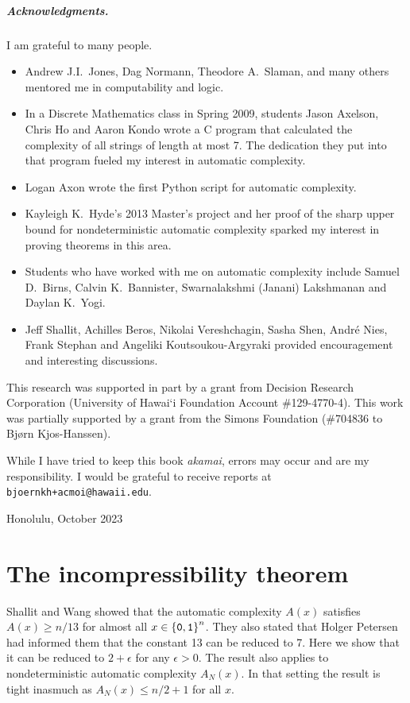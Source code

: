 	\paragraph*{Acknowledgments.}
	I am grateful to many people.
	\begin{itemize}
		\item Andrew J.I.~Jones, Dag Normann, Theodore A.~Slaman, and many others mentored me in computability and logic.
		\item In a Discrete Mathematics class in Spring 2009, students
			Jason Axelson, Chris Ho and Aaron Kondo wrote a C program that calculated the complexity of all strings of length at most 7.
			The dedication they put into that program fueled my interest in automatic complexity.
		\item Logan Axon wrote the first Python script for automatic complexity.
		\item Kayleigh K.~Hyde's 2013 Master's project and
			her proof of the sharp upper bound for nondeterministic automatic complexity sparked my interest in proving theorems in this area.
		\item Students who have worked with me on automatic complexity include Samuel D.~Birns, Calvin K.~Bannister, Swarnalakshmi (Janani) Lakshmanan and Daylan K.~Yogi.
		\item Jeff Shallit, Achilles Beros, Nikolai Vereshchagin, Sasha Shen, Andr\'e Nies, Frank Stephan and Angeliki Koutsoukou-Argyraki
			provided encouragement and interesting discussions.
	\end{itemize}

	This research was supported in part by a grant from Decision Research Corporation
	(University of Hawai\textquoteleft i Foundation Account \#129-4770-4).
	This work was partially supported by a grant from the Simons Foundation (\#704836 to Bj\o rn Kjos-Hanssen).

	While I have tried to keep this book \emph{akamai}, errors may occur and are my responsibility.
	I would be grateful to receive reports at \texttt{bjoernkh+acmoi@hawaii.edu}.

\begin{flushright}	
	Honolulu, October 2023
\end{flushright}


\chapter{The incompressibility theorem}\label{chap:FMS}

	Shallit and Wang showed that the automatic complexity $A(x)$ satisfies $A(x)\ge n/13$ for almost all $x\in{\{\mathtt{0},\mathtt{1}\}}^n$.
	They also stated that Holger Petersen had informed them that the constant 13 can be reduced to 7.
	Here we show that it can be reduced to $2+\epsilon$ for any $\epsilon>0$.
	The result also applies to nondeterministic automatic complexity $A_N(x)$.
	In that setting the result is tight inasmuch as $A_N(x)\le n/2+1$ for all $x$.


